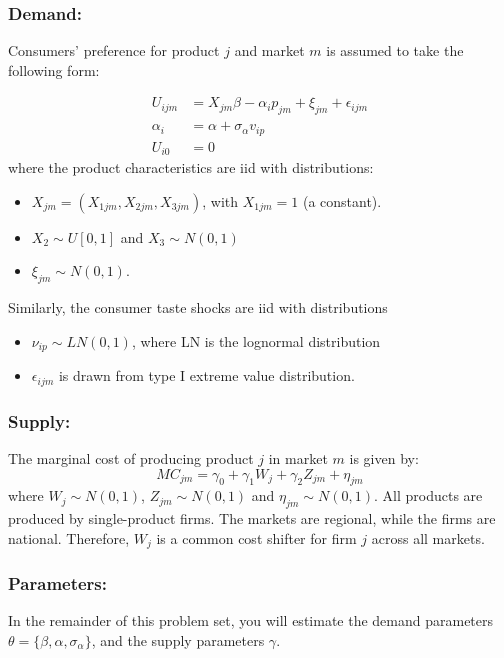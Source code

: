 \documentclass[12pt ]{article}
\begin{document}
\subsubsection{Demand:}
Consumers' preference for product $j$ and market $m$ is assumed to
take the following form:

\begin{align}
U_{ijm} &=X_{jm} \beta - \alpha_i p_{jm} + \xi_{jm} + \epsilon_{ijm} \nonumber\\
\alpha_i &= \alpha+\sigma_{\alpha} v_{ip}\nonumber\\
U_{i0} &= 0
\end{align}
where the product characteristics are iid with distributions:
\begin{itemize}
\item $X_{jm}=(X_{1jm}, X_{2jm}, X_{3jm})$, with $X_{1jm}=1$ (a constant).
\item $X_2\sim U[0,1]$ and $X_3\sim N(0,1)$
\item $\xi_{jm}\sim N(0,1)$.
\end{itemize}

Similarly, the consumer taste shocks are iid with distributions
\begin{itemize}
\item $\nu_{ip}\sim LN(0,1)$, where LN is the lognormal distribution
\item $\epsilon_{ijm}$ is drawn from type I extreme value distribution.
\end{itemize}

\subsubsection{Supply:}
The marginal cost of producing product $j$ in market $m$ is given by:
\begin{equation}
MC_{jm}=\gamma_0+\gamma_1 W_{j}+\gamma_2Z_{jm} +\eta_{jm}
\end{equation}
where $W_j \sim N(0,1)$, $Z_{jm}\sim N(0,1)$ and $\eta_{jm} \sim
N(0,1)$. All products are produced by single-product firms. The
markets are regional, while the firms are national. Therefore, $W_j$
is a common cost shifter for firm $j$ across all markets.

\subsubsection{Parameters:}
In the remainder of this problem set, you will estimate the demand parameters $\theta=\{ \beta, \alpha, \sigma_{\alpha}\}$, and the supply parameters $\gamma$.
\end{document}
